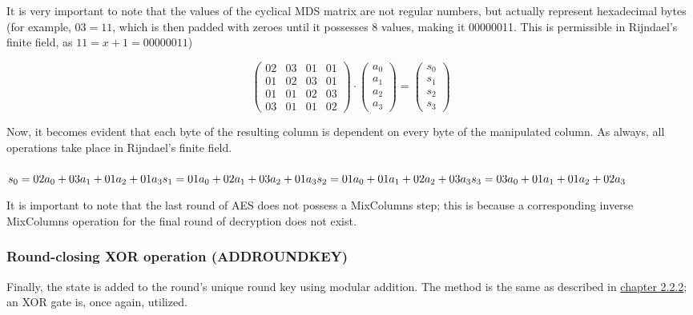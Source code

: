 \documentclass[12pt, a4paper]{report}
\theoremstyle{definition}
\theoremstyle{remark}
\begin{document}
It is very important to note that the values of the cyclical MDS matrix are not regular numbers, but actually represent hexadecimal bytes (for example, $03 = 11$, which is then padded with zeroes until it possesses 8 values, making it 00000011. This is permissible in Rijndael's finite field, as $11 = x+1 = 00000011$)

\[ \left( \begin{array}{cccc}
02 & 03 & 01 & 01 \\
01 & 02 & 03 & 01 \\
01 & 01 & 02 & 03 \\
03 & 01 & 01 & 02\end{array} \right)
\cdot
\left( \begin{array}{c}
a_0 \\
a_1 \\
a_2 \\
a_3\end{array} \right)
=
\left( \begin{array}{c}
s_0 \\
s_1 \\
s_2 \\
s_3\end{array} \right)
\]

Now, it becomes evident that each byte of the resulting column is dependent on every byte of the manipulated column. As always, all operations take place in Rijndael's finite field. \\
\\
$
s_0 = {02}a_0+{03}a_1+{01}a_2+{01}a_3 \\
s_1 = {01}a_0+{02}a_1+{03}a_2+{01}a_3 \\
s_2 = {01}a_0+{01}a_1+{02}a_2+{03}a_3 \\
s_3 = {03}a_0+{01}a_1+{01}a_2+{02}a_3 \\ $

It is important to note that the last round of AES does not possess a MixColumns step; this is because a corresponding inverse MixColumns operation for the final round of decryption does not exist\cite{NoMixColumns}.

\hfill
\subsubsection{Round-closing XOR operation (ADDROUNDKEY)}
Finally, the state is added to the round's unique round key using modular addition. The method is the same as described in \hyperref[InitXOR]{chapter 2.2.2}; an XOR gate is, once again, utilized.
\end{document}
